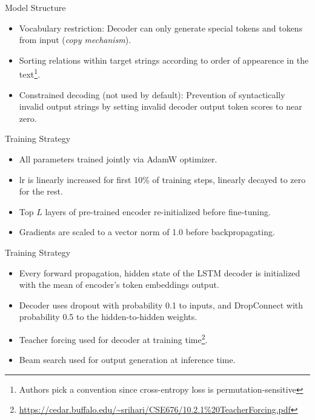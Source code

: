 \documentclass[usenames,dvipsnames,pdf]{beamer}
\begin{document}
        \begin{frame}{Model Structure}
          \begin{itemize}
          \item
            Vocabulary restriction: Decoder can only generate special tokens and tokens from input (\textit{copy mechanism}).
          \item
            Sorting relations within target strings according to order of appearence in the text\footnote{Authors pick a convention since cross-entropy loss is permutation-sensitive}.
          \item
            Constrained decoding (not used by default): Prevention of syntactically invalid output strings by setting invalid decoder output token scores to near zero.
          \end{itemize}

        \end{frame}
        
        \begin{frame}{Training Strategy}
          \begin{itemize}
          \item
            All parameters trained jointly via AdamW optimizer.
          \item
            lr is linearly increased for first 10\% of training steps, linearly decayed to zero for the rest.
          \item
            Top $L$ layers of pre-trained encoder re-initialized before fine-tuning.
          \item
            Gradients are scaled to a vector norm of 1.0 before backpropagating.
          \end{itemize}
        \end{frame}

        \begin{frame}{Training Strategy}
          \begin{itemize}
          \item
            Every forward propagation, hidden state of the LSTM decoder is initialized with the mean of encoder's  token embeddings output.
          \item
            Decoder uses dropout with probability 0.1 to inputs,
            and DropConnect with probability 0.5 to the hidden-to-hidden weights.
          \item
            Teacher forcing used for decoder at training time\footnote{\url{https://cedar.buffalo.edu/~srihari/CSE676/10.2.1\%20TeacherForcing.pdf}}.
          \item
            Beam search used for output generation at inference time.
          \end{itemize}
        \end{frame}
\end{document}
